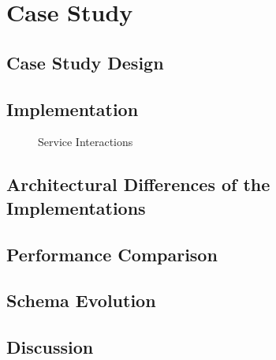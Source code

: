 \section{Case Study}\label{sec:case-study}

\subsection{Case Study Design}

\subsection{Implementation}

\begin{figure}[!htb]
    \centering
    
    \caption{Service Interactions}
    \label{fig:interaction}
\end{figure}

\subsection{Architectural Differences of the Implementations}

\subsection{Performance Comparison}

\subsection{Schema Evolution}

\subsection{Discussion}